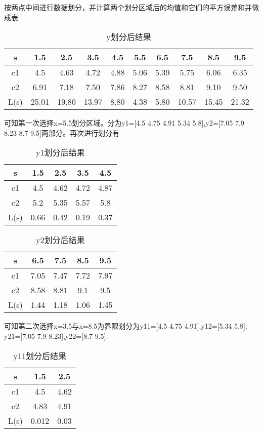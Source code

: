 \documentclass{ctexart}
\begin{document}
按两点中间进行数据划分，并计算两个划分区域后的均值和它们的平方误差和并做成表

\begin{table}[H]
	\centering
	\begin{tabular}{|c|c|c|c|c|c|c|c|c|c|}
	\hline
	s&1.5&2.5&3.5&4.5&5.5&6.5&7.5&8.5&9.5\\
	\hline
	c1&4.5&4.63&4.72&4.88&5.06&5.39&5.75&	6.06&	6.35\\
	\hline
	c2&6.91&7.18&7.50&7.86&8.27&8.58&8.81&9.10&9.50\\
	\hline
	L(s)&25.01&19.80&13.97&8.80&4.38&5.80&10.57&15.45&21.32\\
	\hline
	\end{tabular}
	\caption{y划分后结果}
\end{table}

可知第一次选择x=5.5划分区域。分为y1=[4.5 4.75 4.91 5.34 5.8],y2=[7.05 7.9 8.23 8.7 9.5]两部分。再次进行划分有

\begin{table}[H]
	\centering
	\begin{tabular}{|c|c|c|c|c|}
	\hline
	s&1.5&2.5&3.5&4.5\\
	\hline
	c1&4.5&4.62&4.72&4.87\\
	\hline
	c2&5.2&5.35&5.57&5.8\\
	\hline
	L(s)&0.66&0.42&0.19&0.37\\
	\hline
	\end{tabular}
	\caption{y1划分后结果}
\end{table}

\begin{table}[H]
	\centering
	\begin{tabular}{|c|c|c|c|c|}
	\hline
	s&6.5&7.5&8.5&9.5\\
	\hline
	c1&7.05&7.47&7.72&7.97\\
	\hline
	c2&8.58&8.81&9.1&9.5\\
	\hline
	L(s)&1.44&1.18&1.06&1.45\\
	\hline
	\end{tabular}
	\caption{y2划分后结果}
\end{table}
可知第二次选择x=3.5与x=8.5为界限划分为y11=[4.5 4.75 4.91],y12=[5.34 5.8];
y21=[7.05 7.9 8.23],y22=[8.7 9.5].

\begin{table}[H]
	\centering
	\begin{tabular}{|c|c|c|}
	\hline
	s&1.5&2.5\\
	\hline
	c1&4.5&4.62\\
	\hline
	c2&4.83&4.91\\
	\hline
	L(s)&0.012&0.03\\
	\hline
	\end{tabular}
	\caption{y11划分后结果}
\end{table}
\end{document}
